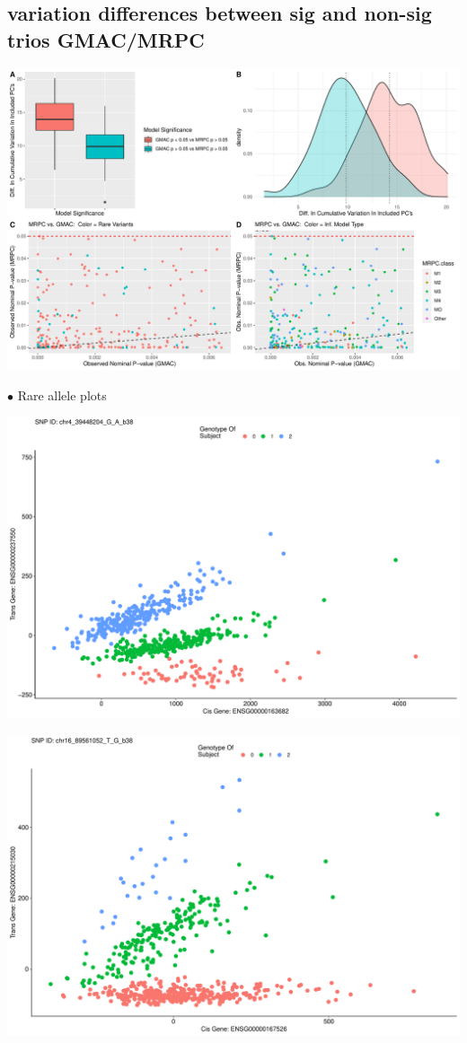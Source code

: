 \documentclass[
]{article}
\begin{document}
\hypertarget{variation-differences-between-sig-and-non-sig-trios-gmacmrpc}{%
\subsection{variation differences between sig and non-sig trios
GMAC/MRPC}\label{variation-differences-between-sig-and-non-sig-trios-gmacmrpc}}

\includegraphics{GMACwriteup_files/figure-latex/unnamed-chunk-12-1.pdf}

\(\bullet\) Rare allele plots

\includegraphics{GMACwriteup_files/figure-latex/unnamed-chunk-13-1.pdf}

\includegraphics{GMACwriteup_files/figure-latex/unnamed-chunk-14-1.pdf}
\end{document}
